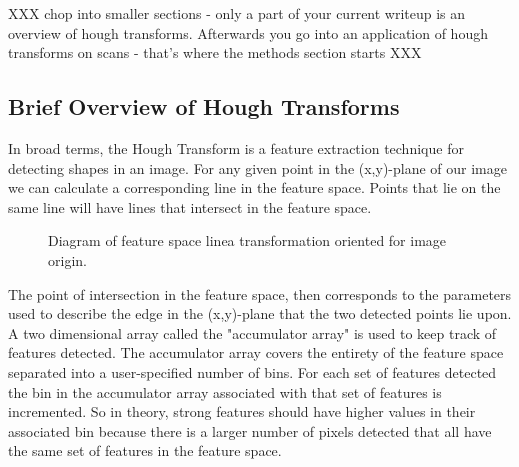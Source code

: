 \documentclass[12pt]{article}
\theoremstyle{nonumberplain}
\begin{document}
XXX chop into smaller sections - only a part of your current writeup is an overview of hough transforms. Afterwards you go into an application of hough transforms on scans - that's where the methods section starts XXX

\subsection{Brief Overview of Hough Transforms}


In broad terms, the Hough Transform is a feature extraction technique for detecting shapes in an image. For any given point in the (x,y)-plane of our image we can calculate a corresponding line in the feature space. Points that lie on the same line will have lines that intersect in the feature space. 
\begin{figure}[!ht]
\begin{subfigure}{.5\textwidth}
\centering
{}
\label{fig: tikz1}
\end{subfigure}
\begin{subfigure}{.5\textwidth}
\centering
{}
\label{fig: tikz2}
\end{subfigure}
\caption{Diagram of feature space linea transformation oriented for image origin.}
\label{fig: parametrization}
\end{figure}


The point of intersection in the feature space, then corresponds to the parameters used to describe the edge in the (x,y)-plane that the two detected points lie upon. A two dimensional array called the "accumulator array" is used to keep track of features detected.  The accumulator array covers the entirety of the feature space separated into a user-specified number of bins. For each set of features detected the bin in the accumulator array associated with that set of features is incremented. So in theory, strong features should have higher values in their associated bin because there is a larger number of pixels detected that all have the same set of features in the feature space. 
\end{document}

